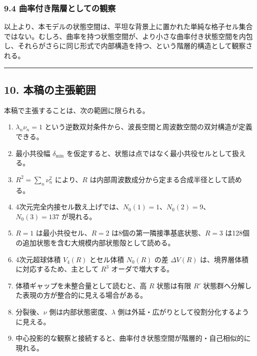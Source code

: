\documentclass[
]{ltjsarticle}
\providecommand{\tightlist}{%
  \setlength{\itemsep}{0pt}\setlength{\parskip}{0pt}}
\begin{document}
\subsubsection{9.4
曲率付き階層としての観察}\label{ux66f2ux7387ux4ed8ux304dux968eux5c64ux3068ux3057ux3066ux306eux89b3ux5bdf}

以上より、本モデルの状態空間は、平坦な背景上に置かれた単純な格子セル集合ではない。むしろ、曲率を持つ状態空間が、より小さな曲率付き状態空間を内包し、それらがさらに同じ形式で内部構造を持つ、という階層的構造として観察される。

\begin{center}\rule{0.5\linewidth}{0.5pt}\end{center}

\subsection{10.
本稿の主張範囲}\label{ux672cux7a3fux306eux4e3bux5f35ux7bc4ux56f2}

本稿で主張することは、次の範囲に限られる。

\begin{enumerate}
\def\labelenumi{\arabic{enumi}.}
\tightlist
\item
  \(\lambda_n\nu_n=1\)
  という逆数双対条件から、波長空間と周波数空間の双対構造が定義できる。
\item
  最小共役幅 \(\delta_{\min}\)
  を仮定すると、状態は点ではなく最小共役セルとして扱える。
\item
  \(R^2=\sum_n\nu_n^2\) により、\(R\)
  は内部周波数成分から定まる合成半径として読める。
\item
  4次元完全内接セル数え上げでは、\(N_0(1)=1\)、\(N_0(2)=9\)、\(N_0(3)=137\)
  が現れる。
\item
  \(R=1\) は最小共役セル、\(R=2\) は8個の第一隣接準基底状態、\(R=3\)
  は128個の追加状態を含む大規模内部状態殻として読める。
\item
  4次元超球体積 \(V_4(R)\) とセル体積 \(N_0(R)\) の差 \(\Delta V(R)\)
  は、境界層体積に対応するため、主として \(R^3\) オーダで増大する。
\item
  体積ギャップを未整合量として読むと、高 \(R\) 状態は有限 \(R'\)
  状態群へ分解した表現の方が整合的に見える場合がある。
\item
  分裂後、\(\nu\) 側は内部状態密度、\(\lambda\)
  側は外延・広がりとして役割分化するように見える。
\item
  中心投影的な観察と接続すると、曲率付き状態空間が階層的・自己相似的に現れる。
\end{enumerate}
\end{document}

